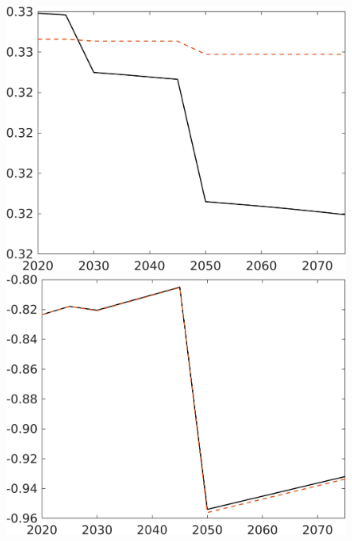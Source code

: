 \begin{figure}[h!!]
\begin{minipage}[]{0.32\textwidth}
	\end{minipage}
	\begin{minipage}[]{0.32\textwidth}
		\includegraphics[width=1\textwidth]{../../codding_model/own_basedOnFried/optimalPol_elastS_DisuSci/figures/all_1705/comp_notaul_OPT_T_NoTaus_hl_spillover0_sep1_BN0_ineq0_etaa0.79.png}
	\end{minipage}
	\begin{minipage}[]{0.32\textwidth}
	\includegraphics[width=1\textwidth]{../../codding_model/own_basedOnFried/optimalPol_elastS_DisuSci/figures/all_1705/comp_notaul_OPT_T_NoTaus_SWF_spillover0_sep1_BN0_ineq0_etaa0.79.png}

\end{minipage}
\end{figure}
